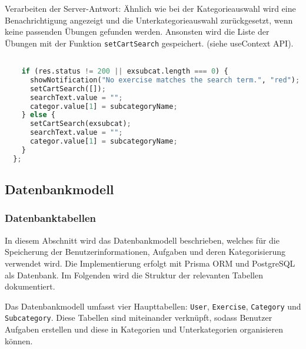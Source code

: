 \documentclass[12pt,a4paper]{article} %
\begin{document}
Verarbeiten der Server-Antwort: Ähnlich wie bei der Kategorieauswahl wird eine Benachrichtigung angezeigt und die Unterkategorieauswahl zurückgesetzt, wenn keine passenden Übungen gefunden werden. Ansonsten wird die Liste der Übungen mit der Funktion \texttt{setCartSearch} gespeichert. (siehe useContext API).


\begin{lstlisting}[language=Python]

    if (res.status != 200 || exsubcat.length === 0) {
      showNotification("No exercise matches the search term.", "red");
      setCartSearch([]);
      searchText.value = "";
      categor.value[1] = subcategoryName;
    } else {
      setCartSearch(exsubcat);
      searchText.value = "";
      categor.value[1] = subcategoryName;
    }
  };
\end{lstlisting}


\subsection{Datenbankmodell}

\subsubsection{Datenbanktabellen}

In diesem Abschnitt wird das Datenbankmodell beschrieben, welches für die Speicherung der Benutzerinformationen, Aufgaben und deren Kategorisierung verwendet wird. Die Implementierung erfolgt mit Prisma ORM und PostgreSQL als Datenbank. Im Folgenden wird die Struktur der relevanten Tabellen dokumentiert.

Das Datenbankmodell umfasst vier Haupttabellen: \texttt{User}, \texttt{Exercise}, \texttt{Category} und \texttt{Subcategory}. Diese Tabellen sind miteinander verknüpft, sodass Benutzer Aufgaben erstellen und diese in Kategorien und Unterkategorien organisieren können.
\end{document}
